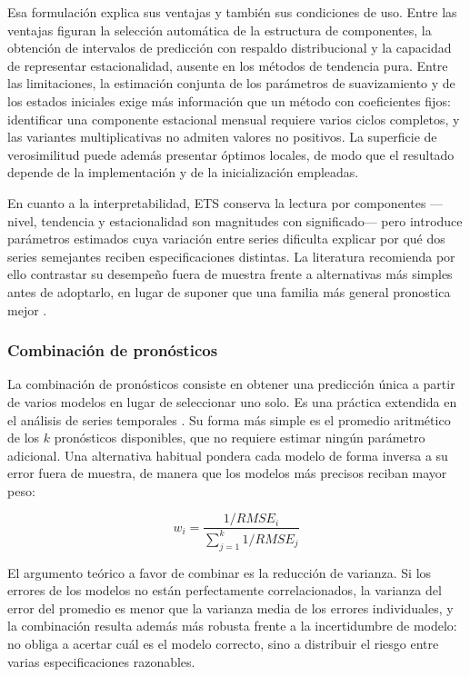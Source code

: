 \documentclass[12pt,letterpaper]{article}
\providecommand{\parencite}{\citep}
\begin{document}
Esa formulación explica sus ventajas y también sus condiciones de uso. Entre las ventajas figuran la selección automática de la estructura de componentes, la obtención de intervalos de predicción con respaldo distribucional y la capacidad de representar estacionalidad, ausente en los métodos de tendencia pura. Entre las limitaciones, la estimación conjunta de los parámetros de suavizamiento y de los estados iniciales exige más información que un método con coeficientes fijos: identificar una componente estacional mensual requiere varios ciclos completos, y las variantes multiplicativas no admiten valores no positivos. La superficie de verosimilitud puede además presentar óptimos locales, de modo que el resultado depende de la implementación y de la inicialización empleadas.

En cuanto a la interpretabilidad, ETS conserva la lectura por componentes ---nivel, tendencia y estacionalidad son magnitudes con significado--- pero introduce parámetros estimados cuya variación entre series dificulta explicar por qué dos series semejantes reciben especificaciones distintas. La literatura recomienda por ello contrastar su desempeño fuera de muestra frente a alternativas más simples antes de adoptarlo, en lugar de suponer que una familia más general pronostica mejor \parencite{hyndman2021fpp3,hyndman_koehler2006}.

\subsubsection{Combinación de pronósticos}
\label{sec:teoria_combinacion}

La combinación de pronósticos consiste en obtener una predicción única a partir de varios modelos en lugar de seleccionar uno solo. Es una práctica extendida en el análisis de series temporales \parencite{hyndman2021fpp3}. Su forma más simple es el promedio aritmético de los \(k\) pronósticos disponibles, que no requiere estimar ningún parámetro adicional. Una alternativa habitual pondera cada modelo de forma inversa a su error fuera de muestra, de manera que los modelos más precisos reciban mayor peso:

\begin{equation}
w_i=\frac{1/RMSE_i}{\sum_{j=1}^{k}1/RMSE_j}
\end{equation}

El argumento teórico a favor de combinar es la reducción de varianza. Si los errores de los modelos no están perfectamente correlacionados, la varianza del error del promedio es menor que la varianza media de los errores individuales, y la combinación resulta además más robusta frente a la incertidumbre de modelo: no obliga a acertar cuál es el modelo correcto, sino a distribuir el riesgo entre varias especificaciones razonables.
\end{document}
